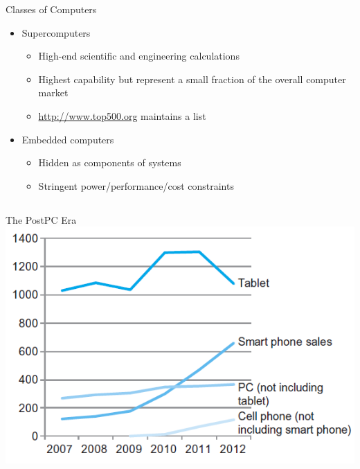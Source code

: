 \documentclass{beamer}
\begin{document}
\begin{frame}{Classes of Computers}
\begin{itemize}
\item Supercomputers
\begin{itemize}
\item High-end scientific and engineering calculations
\item Highest capability but represent a small fraction of the overall computer market 
\item \url{http://www.top500.org} maintains a list
\end{itemize}
\item Embedded computers
\begin{itemize}
\item Hidden as components of systems
\item Stringent power/performance/cost constraints
\end{itemize}
\end{itemize}
\end{frame}

\subsection{}
\begin{frame}{The PostPC Era}
\includegraphics[width=1.0\textwidth]{../imgs/post-pc-era.png}
\end{frame}
\end{document}
